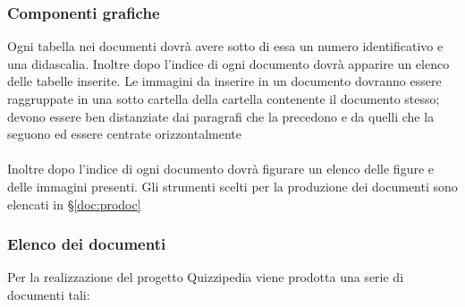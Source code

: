 \documentclass[a4paper,11pt]{article}
\begin{document}
			\subsubsection{Componenti grafiche}
				Ogni tabella nei documenti dovrà avere sotto di essa un numero identificativo e una didascalia. Inoltre dopo l'indice di ogni documento dovrà apparire un elenco delle tabelle inserite.
					Le immagini da inserire in un documento dovranno essere raggruppate in una sotto cartella della cartella contenente il documento stesso; devono essere ben distanziate dai paragrafi che la precedono e da quelli che la seguono ed essere centrate orizzontalmente \\ \\ 
					 Inoltre dopo l'indice di ogni documento dovrà figurare un elenco delle figure e delle immagini presenti. Gli strumenti scelti per la produzione dei documenti sono elencati in §\ref{doc:prodoc}
			\subsubsection{Elenco dei documenti}
			Per la realizzazione del progetto Quizzipedia viene  prodotta una serie di documenti tali:
			 
\end{document}
